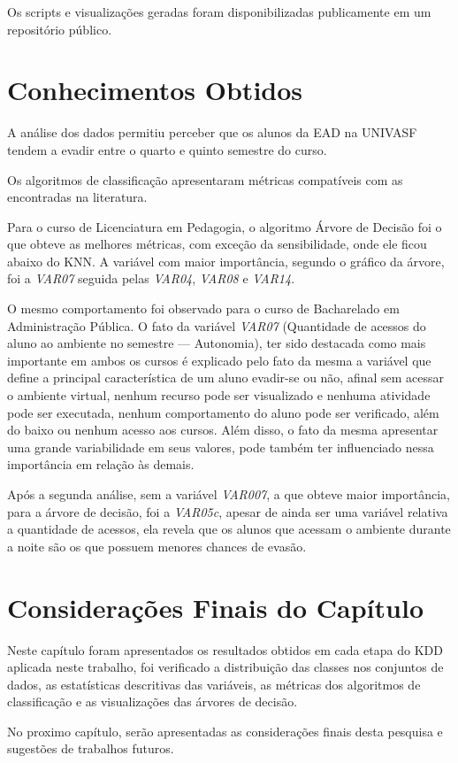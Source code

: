 Os  scripts e visualizações geradas foram disponibilizadas publicamente em um
repositório público.

\section{Conhecimentos Obtidos}

A análise dos dados permitiu perceber que os alunos da EAD na UNIVASF tendem a
evadir entre o quarto e quinto semestre do curso.

Os algoritmos de classificação apresentaram métricas compatíveis com as
encontradas na literatura.

Para o curso de Licenciatura em Pedagogia, o algoritmo Árvore de Decisão foi o
que obteve as melhores métricas, com exceção da sensibilidade, onde ele ficou
abaixo do KNN. A variável com maior importância, segundo o gráfico da árvore,
foi a \textit{VAR07} seguida pelas \textit{VAR04}, \textit{VAR08} e
\textit{VAR14}.

O mesmo comportamento foi observado para o curso de Bacharelado em Administração
Pública. O fato da variável \textit{VAR07} (Quantidade de acessos do aluno ao
ambiente no semestre --- Autonomia), ter sido destacada como mais importante em
ambos os cursos é explicado pelo fato da mesma a variável que define a principal
característica de um aluno evadir-se ou não, afinal sem acessar o ambiente
virtual, nenhum recurso pode ser visualizado e nenhuma atividade pode ser
executada, nenhum comportamento do aluno pode ser verificado, além do baixo ou
nenhum acesso aos cursos. Além disso, o fato da mesma apresentar uma grande
variabilidade em seus valores, pode também ter influenciado nessa importância em
relação às demais.

Após a segunda análise, sem a variável \textit{VAR007}, a que obteve maior
importância, para a árvore de decisão, foi a \textit{VAR05c}, apesar de ainda
ser uma variável relativa a quantidade de acessos, ela revela que os alunos que
acessam o ambiente durante a noite são os que possuem menores chances de evasão.

\section{Considerações Finais do Capítulo}

Neste capítulo foram apresentados os resultados obtidos em cada etapa do KDD
aplicada neste trabalho, foi verificado a distribuição das classes nos conjuntos
de dados, as estatísticas descritivas das variáveis, as métricas dos algoritmos
de classificação e as visualizações das árvores de decisão.

No proximo capítulo, serão apresentadas as considerações finais desta pesquisa e
sugestões de trabalhos futuros.
